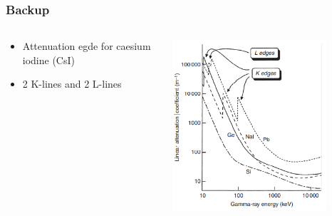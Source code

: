 \documentclass[aspectratio=1610, 9pt]{beamer}
\begin{document}
\begin{frame}\frametitle{Backup}
  \begin{columns}
    \begin{column}[c]{0.45\textwidth}
      \begin{itemize}
        \item Attenuation egde for caesium iodine (CsI)
        \item 2 K-lines and 2 L-lines
      \end{itemize}
    \end{column}
  \begin{column}[c]{0.45\textwidth}
    \includegraphics[width=0.8\textwidth]{plots/attenuation_edges.png}
  \end{column}
  \end{columns}
\end{frame}
\end{document}
